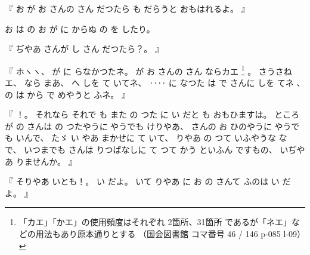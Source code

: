 %
『
お
が
お
さんの
さん
だつたら
も
だらうと
おもはれるよ。
』

%
お
は
の
お
が
に
からぬ
の
を
したり。

%
『
ぢやあ
さんが
し
さん
だつたら？。
』

%
『
ホヽヽ、
%
が
に
らなかつたネ。
%
が
お
さんの
さん%
ならカエ
\footnote{「カエ」「かエ」の使用頻度はそれぞれ 2箇所、31箇所 であるが「ネエ」などの用法もあり原本通りとする
（国会図書館 コマ番号 46 / 146 p-085 l-09）}%
。
%
さうさねエ、
%
なら
まあ、
%
へ
しを
て
いてネ、
%
‥‥
に
なつた
は
で
さんに
しを
てネ
、
%
%
の
は
から
で
めやうと
ふネ。
』

%
『
！。
%
それなら
それで
も
また
の
つた
に
い
だと
も
おもひますは。
%
ところが
の
さんは
の
つたやうに
やうでも
けりやあ、
%
さんの
お
ひのやうに
やうでも
いんで、
%
たゞ
い
やあ
まかせに
て
いて、
%
りやあ
の%
つて
いふやうな
な
で、
%
いつまでも
さんは
りつぱなしに
て
つて
かう
といふん
ですもの、
%
いぢやあ
りませんか。
』

%
『
そりやあ
いとも！。
%
い
だよ。
%
いて
りやあ
に
お
の
さんて
ふのは
い
だよ。
』

